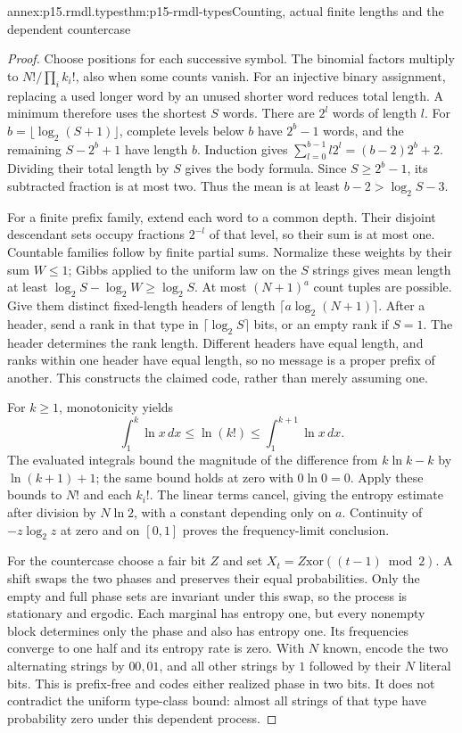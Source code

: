 \begin{annexitem}{annex:p15.rmdl.types}{thm:p15-rmdl-types}{Counting, actual finite lengths and the dependent countercase}
\begin{proof}
Choose positions for each successive symbol. The binomial factors
multiply to \(N!/\prod_i k_i!\), also when some counts vanish.
For an injective binary assignment, replacing a used longer word by an
unused shorter word reduces total length. A minimum therefore uses
the shortest \(S\) words. There are \(2^l\) words of length \(l\).
For \(b=\lfloor\log_2(S+1)\rfloor\), complete levels below \(b\)
have \(2^b-1\) words, and the remaining \(S-2^b+1\) have length
\(b\). Induction gives
\(\sum_{l=0}^{b-1}l2^l=(b-2)2^b+2\). Dividing their total length
by \(S\) gives the body formula. Since \(S\geq2^b-1\), its
subtracted fraction is at most two. Thus the mean is at least
\(b-2>\log_2S-3\).

For a finite prefix family, extend each word to a common depth. Their
disjoint descendant sets occupy fractions \(2^{-l}\) of that level,
so their sum is at most one. Countable families follow by finite partial
sums. Normalize these weights by their sum \(W\leq1\); Gibbs applied
to the uniform law on the \(S\) strings gives mean length at least
\(\log_2S-\log_2W\geq\log_2S\).
At most \((N+1)^a\) count tuples are possible. Give them distinct
fixed-length headers of length \(\lceil a\log_2(N+1)\rceil\).
After a header, send a rank in that type in \(\lceil\log_2S\rceil\)
bits, or an empty rank if \(S=1\). The header determines the rank
length. Different headers have equal length, and ranks within one
header have equal length, so no message is a proper prefix of another.
This constructs the claimed code, rather than merely assuming one.

For \(k\geq1\), monotonicity yields
\[
 \int_1^k\ln x\,dx\leq\ln(k!)\leq\int_1^{k+1}\ln x\,dx.
\]
The evaluated integrals bound the magnitude of the difference from
\(k\ln k-k\) by \(\ln(k+1)+1\); the same bound holds at zero
with \(0\ln0=0\). Apply these bounds to \(N!\) and each \(k_i!\).
The linear terms cancel, giving the entropy estimate after division by
\(N\ln2\), with a constant depending only on \(a\).
Continuity of \(-z\log_2z\) at zero and on \([0,1]\) proves the
frequency-limit conclusion.

For the countercase choose a fair bit \(Z\) and set
\(X_t=Z\mathbin{\mathrm{xor}}((t-1)\bmod2)\). A shift swaps the
two phases and preserves their equal probabilities. Only the empty and
full phase sets are invariant under this swap, so the process is stationary
and ergodic. Each marginal has entropy one, but every nonempty block
determines only the phase and also has entropy one. Its frequencies
converge to one half and its entropy rate is zero. With \(N\) known,
encode the two alternating strings by \(00,01\), and all other
strings by \(1\) followed by their \(N\) literal bits. This is
prefix-free and codes either realized phase in two bits. It does not
contradict the uniform type-class bound: almost all strings of that
type have probability zero under this dependent process.
\end{proof}
\end{annexitem}

